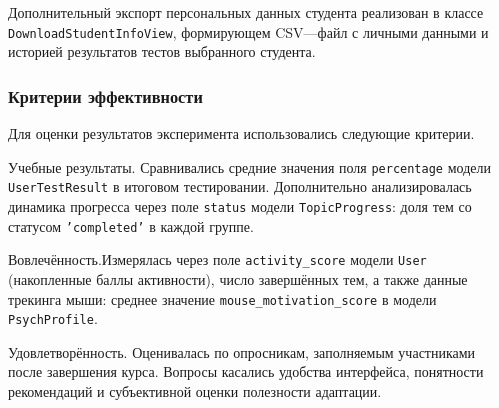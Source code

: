 Дополнительный экспорт персональных данных студента реализован в 
классе \texttt{DownloadStudentInfoView}, формирующем CSV---файл с 
личными данными и историей результатов тестов выбранного студента.

\subsubsection{Критерии эффективности}

Для оценки результатов эксперимента использовались следующие критерии.

Учебные результаты. Сравнивались средние значения поля 
\texttt{percentage} модели \texttt{UserTestResult} в итоговом 
тестировании. Дополнительно анализировалась динамика прогресса 
через поле \texttt{status} модели \texttt{TopicProgress}: доля тем 
со статусом \texttt{'completed'} в каждой группе.

Вовлечённость.Измерялась через поле \texttt{activity\_score} 
модели \texttt{User} (накопленные баллы активности), число завершённых 
тем, а также данные трекинга мыши: среднее значение 
\texttt{mouse\_motivation\_score} в модели \texttt{PsychProfile}.

Удовлетворённость. Оценивалась по опросникам, заполняемым 
участниками после завершения курса. Вопросы касались удобства 
интерфейса, понятности рекомендаций и субъективной оценки полезности 
адаптации.